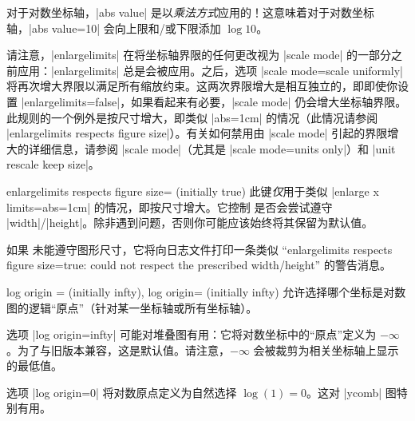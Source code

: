 \begin{pgfplotsxykeylist}
    对于对数坐标轴，|abs value| 是以\emph{乘法方式}应用的！这意味着对于对数坐标轴，|abs value=10| 会向上限和/或下限添加 $\log 10$。
\begin{codeexample}[]
\end{codeexample}

    请注意，|enlargelimits| 在将坐标轴界限的任何更改视为 |scale mode| 的一部分之前应用：|enlargelimits| 总是会被应用。之后，选项 |scale mode=scale uniformly| 将再次增大界限以满足所有缩放约束。这两次界限增大是相互独立的，即即使你设置 |enlargelimits=false|，如果看起来有必要，|scale mode| 仍会增大坐标轴界限。此规则的一个例外是按尺寸增大，即类似 |abs=1cm| 的情况（此情况请参阅 |enlargelimits respects figure size|）。有关如何禁用由 |scale mode| 引起的界限增大的详细信息，请参阅 |scale mode|（尤其是 |scale mode=units only|）和 |unit rescale keep size|。
\end{pgfplotsxykeylist}

\begin{pgfplotskey}{enlargelimits respects figure size= (initially true)}
    此键\emph{仅}用于类似 |enlarge x limits={abs=1cm}| 的情况，即按尺寸增大。它控制 \PGFPlots{} 是否会尝试遵守 |width|/|height|。除非遇到问题，否则你可能应该始终将其保留为默认值。

    如果 \PGFPlots{} 未能遵守图形尺寸，它将向日志文件打印一条类似 ``enlargelimits respects figure size=true: could not respect the prescribed width/height'' 的警告消息。
\end{pgfplotskey}

\begin{pgfplotsxykeylist}{%
    log origin \x= (initially infty),
    log origin= (initially infty)%
}
    允许选择哪个坐标是对数图的逻辑“原点”（针对某一坐标轴或所有坐标轴）。

    选项 |log origin=infty| 可能对堆叠图有用：它将对数坐标中的“原点”定义为 $-\infty$。为了与旧版本兼容，这是默认值。请注意，$-\infty$ 会被裁剪为相关坐标轴上显示的最低值。

    选项 |log origin=0| 将对数原点定义为自然选择 $\log(1)=0$。这对 |ycomb| 图特别有用。
\end{pgfplotsxykeylist}

